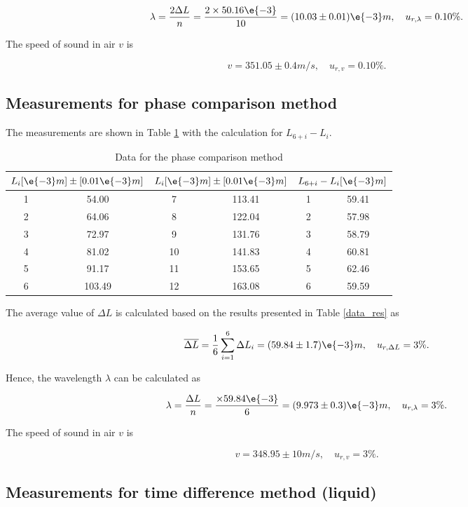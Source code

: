 \[
        \lambda=\frac{2\Delta L}{n}=\frac{2\times50.16\e{-3}}{10}=(10.03\pm0.01)\e{-3}m,\quad u_{r,\lambda}=0.10\%.
\]

The speed of sound in air $v$ is

\[
    v=351.05\pm0.4 m/s,\quad u_{r,v}=0.10\%.
\]

\subsection{Measurements for phase comparison method}

The measurements are shown in Table \ref{data_pha} with the calculation for $L_{6+i}-L_i$.

\begin{table}[H] \small
    \centering
    \begin{tabular}{|c|c|c|c|c|c|}
    \hline
        \multicolumn{2}{|c|}{$L_i[\e{-3}m]\pm[0.01\e{-3}m]$} & 
        \multicolumn{2}{|c|}{$L_i[\e{-3}m]\pm[0.01\e{-3}m]$} &
        \multicolumn{2}{|c|}{$L_{6+i}-L_i[\e{-3}m]$}\\\hline
        1 & 54.00 & 7 & 113.41 & 1 & 59.41 \\\hline
        2 & 64.06 & 8 & 122.04 & 2 & 57.98 \\\hline
        3 & 72.97 & 9 & 131.76 & 3 & 58.79 \\\hline
        4 & 81.02 & 10 & 141.83 & 4 & 60.81 \\\hline
        5 & 91.17 & 11 & 153.65 & 5 & 62.46 \\\hline
        6 & 103.49 & 12 & 163.08 & 6 & 59.59 \\\hline
    \end{tabular}
    \caption{Data for the phase comparison method}\label{data_pha}
\end{table}
    
The average value of $\Delta L$ is calculated  based on the results presented in Table \ref{data_res} as

\[
    \overline{\Delta L}=\frac{1}{6}\sum_{i=1}^{6}\Delta L_i=(59.84\pm 1.7)\e{-3}m,\quad u_{r,\Delta L}=3\%.
\]

Hence, the wavelength $\lambda$ can be calculated as

\[
    \lambda=\frac{\Delta L}{n}=\frac{\times59.84\e{-3}}{6}=(9.973\pm0.3)\e{-3}m,\quad u_{r,\lambda}=3\%.
\]

The speed of sound in air $v$ is

\[
v=348.95\pm10 m/s,\quad u_{r,v}=3\%.
\]

\subsection{Measurements for time difference method (liquid)}


